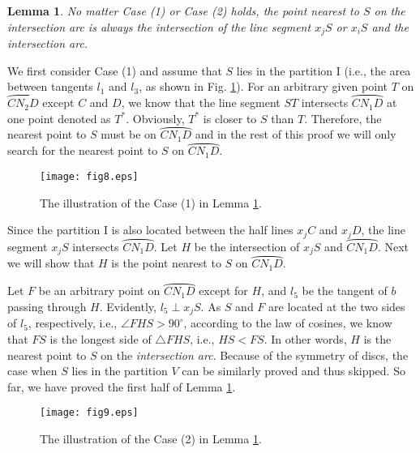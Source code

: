 \documentclass[journal]{IEEEtran}
\newtheorem{lemma}{Lemma}
\begin{document}
\begin{lemma}\label{lemma3}
No matter Case (1) or Case (2) holds, the point nearest to $S$ on the \emph{intersection arc} is always the intersection of the line segment $x_jS$ or $x_iS$ and the \emph{intersection arc}.
\end{lemma}
\begin{IEEEproof}
We first consider Case (1) and assume that $S$ lies in the partition $\mathrm{I}$ (i.e., the area between tangents $l_1$ and $l_3$, as shown in Fig. \ref{fig8}).
For an arbitrary given point $T$ on $\wideparen{CN_2D}$ except $C$ and $D$, we know that the line segment $ST$ intersects $\wideparen{CN_1D}$ at one
point denoted as $T^*$. Obviously, $T^*$ is closer to $S$ than $T$. Therefore, the nearest point to $S$ must be on $\wideparen{CN_1D}$ and in the
rest of this proof we will only search for the nearest point to $S$ on $\wideparen{CN_1D}$.

\begin{figure}
\begin{center}
\texttt{[image: fig8.eps]}    \caption{The illustration of the Case (1) in Lemma \ref{lemma3}.}
\label{fig8}                                 \end{center}                                 \end{figure}

Since the partition $\mathrm{I}$ is also located between the half lines $x_jC$ and $x_jD$, the line segment $x_jS$ intersects $\wideparen{CN_1D}$. Let $H$ be the intersection
of $x_jS$ and $\wideparen{CN_1D}$. Next we will show that $H$ is the point nearest to $S$ on $\wideparen{CN_1D}$.

Let $F$ be an arbitrary point on $\wideparen{CN_1D}$ except for $H$, and $l_5$ be the tangent of $b$ passing through $H$. Evidently, $l_5\perp x_jS$.
As $S$ and $F$ are located at the two sides of $l_5$, respectively, i.e., $\angle FHS>90^{\circ}$, according to the law of cosines, we know that $FS$ is
the longest side of $\triangle FHS$, i.e., $HS<FS$. In other words, $H$ is the nearest point to $S$ on the \emph{intersection arc}.
Because of the symmetry of discs, the case when $S$ lies in the partition $V$ can be similarly proved and thus skipped. So far, we have proved the first half of Lemma \ref{lemma3}.

\begin{figure}
\begin{center}
\texttt{[image: fig9.eps]}    \caption{The illustration of the Case (2) in Lemma \ref{lemma3}.}
\label{fig9}                                 \end{center}                                 \end{figure}


\end{IEEEproof}
\end{document}
